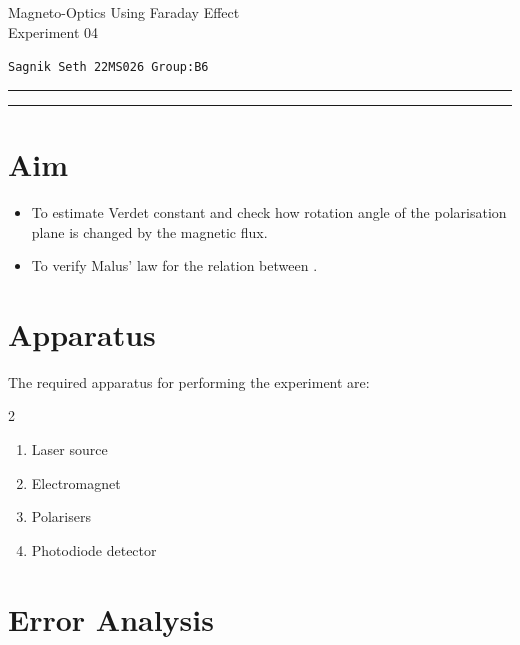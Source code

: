 \documentclass[usenames, svgnames, dvipsnames]{scrartcl}
\begin{document}
        \begin{center}
            {\rmfamily
                \Large{\textcolor{blue!30!black}{%
                    \textmd{{\Large{{M}}}}agneto-\textmd{{\Large{{O}}}}ptics \textmd{{\Large{{U}}}}sing Faraday Effect  \\
                     {\Large Experiment} 04%
                }}\\[0.4cm]
            }
            \end{center}
        \begin{center}
           \large \texttt{{{\LARGE  S}agnik {\LARGE S}eth\hspace{0.3cm} 22MS026 \hspace{0.3cm} Group:B6}}
        \end{center}
\hrule
\vspace{0.08cm}
\hrule
\vspace{0.6cm}
\section{Aim}
\begin{itemize}
  \item To estimate Verdet constant and check how rotation angle of the polarisation plane is changed by the magnetic flux.
  \item To verify Malus' law for the relation between .
\end{itemize}
\section{Apparatus}
The required apparatus for performing the experiment are:
\begin{multicols}{2}
\begin{enumerate}
  \item Laser source
  \item Electromagnet
  \item Polarisers
  \item Photodiode detector
\end{enumerate}
\end{multicols}



\section{Error Analysis}
\end{document}
